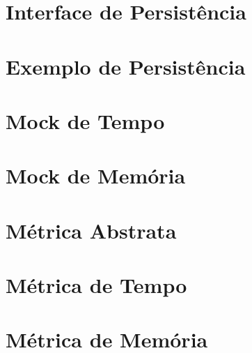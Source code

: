 \documentclass[12pt]{tcc}
\begin{document}
\section{Interface de Persistência}


\section{Exemplo de Persistência}


\section{Mock de Tempo}


\section{Mock de Memória}


\section{Métrica Abstrata}


\section{Métrica de Tempo}


\section{Métrica de Memória}

\end{document}
